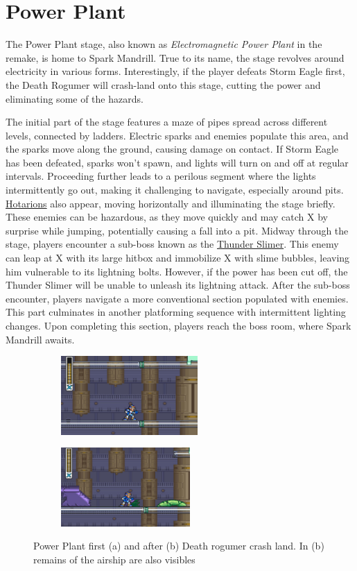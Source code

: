 \section{Power Plant}
The Power Plant stage, also known as \textit{Electromagnetic Power Plant} in the remake, is home to Spark Mandrill. True to its name, the stage revolves around electricity in various forms. Interestingly, if the player defeats Storm Eagle first, the Death Rogumer will crash-land onto this stage, cutting the power and eliminating some of the hazards.

The initial part of the stage features a maze of pipes spread across different levels, connected by ladders. Electric sparks and enemies populate this area, and the sparks move along the ground, causing damage on contact. If Storm Eagle has been defeated, sparks won't spawn, and lights will turn on and off at regular intervals. Proceeding further leads to a perilous segment where the lights intermittently go out, making it challenging to navigate, especially around pits. \hyperlink{enem:Hotarion}{Hotarions} also appear, moving horizontally and illuminating the stage briefly. These enemies can be hazardous, as they move quickly and may catch X by surprise while jumping, potentially causing a fall into a pit. Midway through the stage, players encounter a sub-boss known as the \hyperlink{miniboss:Thunder_Slimer}{Thunder Slimer}. This enemy can leap at X with its large hitbox and immobilize X with slime bubbles, leaving him vulnerable to its lightning bolts. However, if the power has been cut off, the Thunder Slimer will be unable to unleash its lightning attack. After the sub-boss encounter, players navigate a more conventional section populated with enemies. This part culminates in another platforming sequence with intermittent lighting changes. Upon completing this section, players reach the boss room, where Spark Mandrill awaits.
\begin{figure}[htp]
	\centering
	\begin{subfigure}{0.45\linewidth}
		\centering
		\includegraphics[height=3cm]{figures/X1/Spark_mandrill/Mandrill_power.jpg}
		\caption{}
	\end{subfigure}
	\begin{subfigure}{0.45\linewidth}
		\centering
		\includegraphics[height=3cm]{figures/X1/Spark_mandrill/Mandrill_no_power.jpg}
		\caption{}
	\end{subfigure}
	\caption{Power Plant first (a) and after (b) Death rogumer crash land. In (b) remains of the airship are also visibles}
\end{figure}
